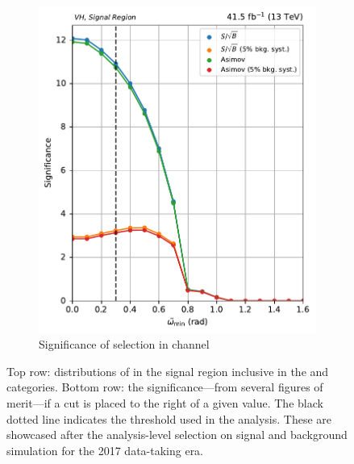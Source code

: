 \begin{figure}[htbp]
\begin{subfigure}[b]{0.4\textwidth}
        \includegraphics[width=\textwidth]{figures/category_optimisations/with_mindphi_cut/significance_VH_min_omega_tilde_all.pdf}
        \caption{Significance of selection in \VH channel}
    \end{subfigure}
    \caption[Distributions of \omegaTilde in the signal region inclusive in the \ttH and \VH categories, along with the significance---from several figures of merit---if a cut is placed to the right of a given value]{Top row: distributions of \omegaTilde in the signal region inclusive in the \ttH and \VH categories. Bottom row: the significance---from several figures of merit---if a cut is placed to the right of a given value. The black dotted line indicates the threshold used in the analysis. These are showcased after the analysis-level selection on signal and background simulation for the 2017 data-taking era.}
    \label{fig:htoinv_category_optimisations_significances}
\end{figure}


